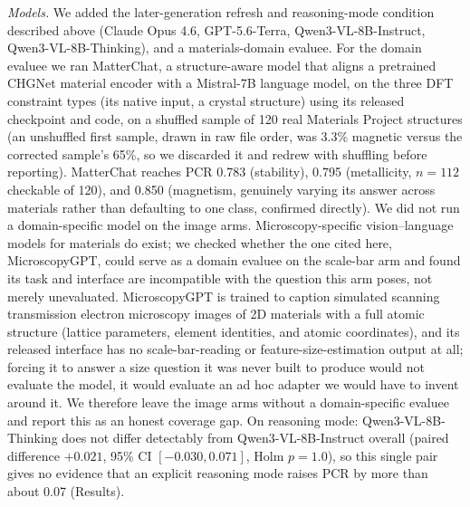 \documentclass[pdflatex,sn-nature]{sn-jnl}
\newcommand{\rev}[1]{#1}
\newcommand{\rev}[1]{{\color{blue}#1}}
\begin{document}
\noindent\emph{Models.} We added the later-generation refresh and reasoning-mode
condition described above (Claude Opus 4.6, GPT-5.6-Terra, Qwen3-VL-8B-Instruct,
Qwen3-VL-8B-Thinking), and a materials-domain evaluee. For the domain evaluee we ran
MatterChat\cite{matterchat2026}, a structure-aware model that aligns a pretrained CHGNet
material encoder with a Mistral-7B language model, on the three DFT constraint types (its
native input, a crystal structure) using its released checkpoint and code, on a shuffled
sample of 120 real Materials Project structures (an unshuffled first sample, drawn in raw
file order, was 3.3\% magnetic versus the corrected sample's 65\%, so we discarded it and
redrew with shuffling before reporting). MatterChat reaches PCR 0.783 (stability), 0.795
(metallicity, $n=112$ checkable of 120), and 0.850 (magnetism, genuinely varying its answer
across materials rather than defaulting to one class, confirmed directly). We did not run a domain-specific model on the image arms.
Microscopy-specific vision--language models for materials do exist; we checked whether the
one cited here, MicroscopyGPT,\cite{choudhary2025microscopygpt} could serve as a domain
evaluee on the scale-bar arm and found its task and interface are incompatible with the
question this arm poses, not merely unevaluated. MicroscopyGPT is trained to caption
simulated scanning transmission electron microscopy images of 2D materials with a full
atomic structure (lattice parameters, element identities, and atomic coordinates), and its
released interface has no scale-bar-reading or feature-size-estimation output at all; forcing
it to answer a size question it was never built to produce would not evaluate the model, it
would evaluate an ad hoc adapter we would have to invent around it. We therefore leave the
image arms without a domain-specific evaluee and report this as an honest coverage gap. On reasoning mode: Qwen3-VL-8B-Thinking \rev{does not differ detectably from}
Qwen3-VL-8B-Instruct overall (\rev{paired difference $+0.021$, 95\% CI $[-0.030,0.071]$, Holm $p=1.0$}), so
\rev{this single pair gives no evidence that an explicit reasoning mode raises PCR by more than about 0.07} (Results).
\end{document}
